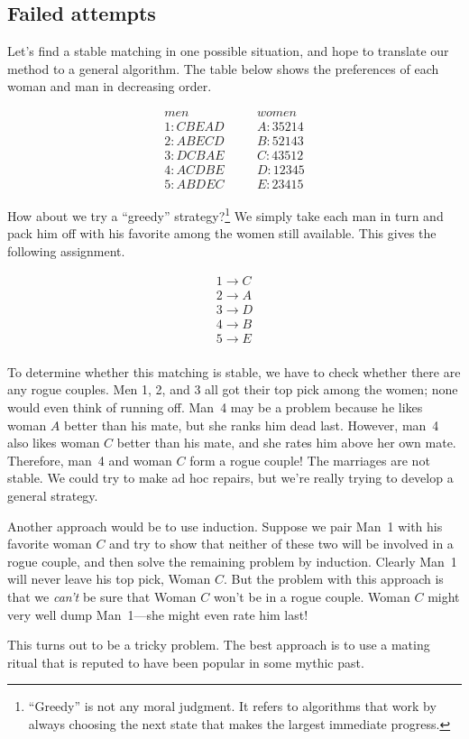 \begin{editingnotes}
\subsection{Failed attempts}
Let's find a stable matching in one possible situation, and hope to
translate our method to a general algorithm.  The table below shows the
preferences of each woman and man in decreasing order.

\begin{eqnarray*}
men & \quad & women \\
1 : C B E A D & \quad & A : 3 5 2 1 4 \\
2 : A B E C D & \quad & B : 5 2 1 4 3 \\
3 : D C B A E & \quad & C : 4 3 5 1 2 \\
4 : A C D B E & \quad & D : 1 2 3 4 5 \\
5 : A B D E C & \quad & E : 2 3 4 1 5
\end{eqnarray*}

How about we try a ``greedy'' strategy?\footnote{``Greedy'' is not any
moral judgment.  It refers to algorithms that work by always choosing the
next state that makes the largest immediate progress.}  We simply take
each man in turn and pack him off with his favorite among the women still
available.  This gives the following assignment.

\begin{eqnarray*}
1 \rightarrow C \\
2 \rightarrow A \\
3 \rightarrow D \\
4 \rightarrow B \\
5 \rightarrow E \\
\end{eqnarray*}

To determine whether this matching is stable, we have to check whether
there are any rogue couples.  Men 1, 2, and 3 all got their top pick
among the women; none would even think of running off.  Man~4 may be a
problem because he likes woman $A$ better than his mate, but she ranks him
dead last.  However, man~4 also likes woman $C$ better than his mate, and
she rates him above her own mate.  Therefore, man~4 and woman $C$ form a
rogue couple!  The marriages are not stable.  We could try to make ad hoc
repairs, but we're really trying to develop a general strategy.

Another approach would be to use induction.  Suppose we pair Man~1
with his favorite woman $C$ and try to show that neither of these two
will be involved in a rogue couple, and then solve the remaining
problem by induction.  Clearly Man~1 will never leave his top pick,
Woman $C$.  But the problem with this approach is that we \emph{can't}
be sure that Woman $C$ won't be in a rogue couple.  Woman $C$ might very
well dump Man~1---she might even rate him last!

This turns out to be a tricky problem.  The best approach is to use a
mating ritual that is reputed to have been popular in some mythic past.
\end{editingnotes}

